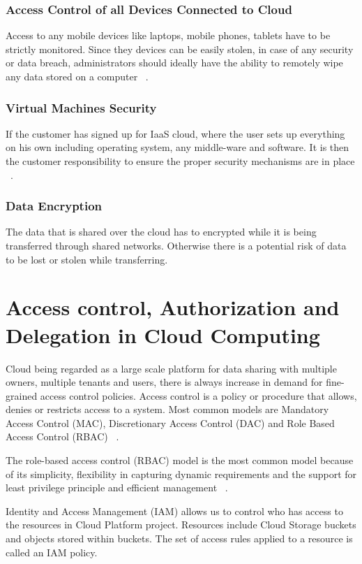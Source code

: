 \subsubsection{Access Control of all Devices Connected to Cloud}
Access to any mobile devices like laptops, mobile phones, tablets have to be 
strictly monitored. Since they devices can be easily stolen, in case of any 
security or data breach, administrators should ideally have the ability 
to remotely wipe any data stored on a computer ~\cite{hid-sp18-513-diversity}.

\subsubsection{Virtual Machines Security}
If the customer has signed up for IaaS cloud, where the user sets up
everything on his own including operating system, any middle-ware
and software. It is then the customer responsibility to ensure the
proper security mechanisms are in place ~\cite{hid-sp18-513-diversity}.
\subsubsection{Data Encryption}
The data that is shared over the cloud has to encrypted while it 
is being transferred through shared networks. Otherwise there is a 
potential risk of data to be lost or stolen while transferring.

\section{Access control, Authorization and Delegation in Cloud Computing}
Cloud being regarded as a large scale platform for data sharing with 
multiple owners, multiple tenants and users, there is always increase in
demand for fine-grained access control policies. Access control is a policy 
or procedure that allows, denies or restricts access to a system. Most
common models are Mandatory Access Control (MAC), Discretionary Access 
Control (DAC) and Role Based Access Control (RBAC) ~\cite{hid-sp18-513-accesscntrl}.

The role-based access control (RBAC) model is the most common 
model because of its simplicity, flexibility in capturing dynamic 
requirements and the support for least privilege principle 
and efficient management ~\cite{hid-sp18-513-cloud3}. 

Identity and Access Management (IAM) allows us to control who has access 
to the resources in Cloud Platform project. Resources include Cloud Storage 
buckets and objects stored within buckets. The set of access rules 
applied to a resource is called an IAM policy. 

